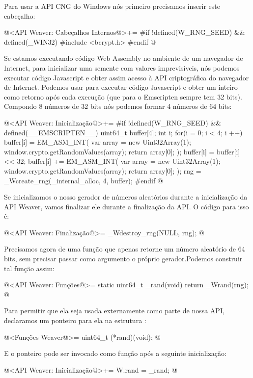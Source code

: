 Para usar a API CNG do Windows nós primeiro precisamos inserir este
cabeçalho:

\iniciocodigo
@<API Weaver: Cabeçalhos Internos@>+=
#if !defined(W_RNG_SEED) && defined(_WIN32)
#include <bcrypt.h>
#endif
@
\fimcodigo

Se estamos executando código Web Assembly no ambiente de um navegador
de Internet, para inicializar uma semente com valores imprevisíveis,
nós podemos executar código Javascript e obter assim acesso à API
criptográfica do navegador de Internet. Podemos
usar  para executar código Javascript e obter
um inteiro como retorno após cada execução (que para o Emscripten
sempre tem 32 bits). Compondo 8 números de 32 bits nós podemos formar
4 números de 64 bits:

\iniciocodigo
@<API Weaver: Inicialização@>+=
#if !defined(W_RNG_SEED) && defined(__EMSCRIPTEN__)
{
  uint64_t buffer[4];
  int i;
  for(i = 0; i < 4; i ++){
    buffer[i] = EM_ASM_INT({
      var array = new Uint32Array(1);
      window.crypto.getRandomValues(array);
      return array[0];
    });
    buffer[i] = buffer[i] << 32;
    buffer[i] += EM_ASM_INT({
      var array = new Uint32Array(1);
      window.crypto.getRandomValues(array);
      return array[0];
    });
  }
  rng = _Wcreate_rng(_internal_alloc, 4, buffer);
}
#endif
@
\fimcodigo

Se inicializamos o nosso gerador de números aleatórios durante a
inicialização da API Weaver, vamos finalizar ele durante a finalização
da API. O código para isso é:

\iniciocodigo
@<API Weaver: Finalização@>=
_Wdestroy_rng(NULL, rng);
@
\fimcodigo

Precisamos agora de uma função que apenas retorne um número aleatório
de 64 bits, sem precisar passar como argumento o próprio
gerador.Podemos construir tal função assim:

\iniciocodigo
@<API Weaver: Funções@>=
static uint64_t _rand(void){
  return _Wrand(rng);
}
@
\fimcodigo

Para permitir que ela seja usada externamente como parte de nossa API,
declaramos um ponteiro para ela na estrutura :

\iniciocodigo
@<Funções Weaver@>=
uint64_t (*rand)(void);
@
\fimcodigo

E o ponteiro pode ser invocado como função após a seguinte
inicialização:

\iniciocodigo
@<API Weaver: Inicialização@>+=
W.rand = _rand;
@
\fimcodigo



